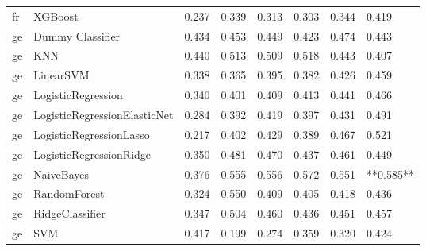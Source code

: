\begin{tabular}{llllllll}
      fr &                      XGBoost & 0.237 &                     0.339 &                 0.313 &                  0.303 &                                   0.344 &     0.419 \\
      ge &             Dummy Classifier & 0.434 &                     0.453 &                 0.449 &                  0.423 &                                   0.474 &     0.443 \\
      ge &                          KNN & 0.440 &                     0.513 &                 0.509 &                  0.518 &                                   0.443 &     0.407 \\
      ge &                    LinearSVM & 0.338 &                     0.365 &                 0.395 &                  0.382 &                                   0.426 &     0.459 \\
      ge &           LogisticRegression & 0.340 &                     0.401 &                 0.409 &                  0.413 &                                   0.441 &     0.466 \\
      ge & LogisticRegressionElasticNet & 0.284 &                     0.392 &                 0.419 &                  0.397 &                                   0.431 &     0.491 \\
      ge &      LogisticRegressionLasso & 0.217 &                     0.402 &                 0.429 &                  0.389 &                                   0.467 &     0.521 \\
      ge &      LogisticRegressionRidge & 0.350 &                     0.481 &                 0.470 &                  0.437 &                                   0.461 &     0.449 \\
      ge &                   NaiveBayes & 0.376 &                     0.555 &                 0.556 &                  0.572 &                                   0.551 & **0.585** \\
      ge &                 RandomForest & 0.324 &                     0.550 &                 0.409 &                  0.405 &                                   0.418 &     0.436 \\
      ge &              RidgeClassifier & 0.347 &                     0.504 &                 0.460 &                  0.436 &                                   0.451 &     0.457 \\
      ge &                          SVM & 0.417 &                     0.199 &                 0.274 &                  0.359 &                                   0.320 &     0.424 \\

\end{tabular}
